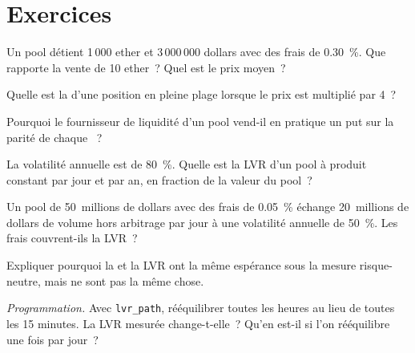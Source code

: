 \section{Exercices}

\begin{exercise}[$\star$]\label{exo:m3:automated-market-makers:1}
Un pool détient 1\,000 ether et 3\,000\,000 dollars avec des frais de 0.30~\%. Que rapporte la vente de 10 ether~? Quel est le prix moyen~?
\end{exercise}

\begin{exercise}[$\star$]\label{exo:m3:automated-market-makers:2}
Quelle est la  d'une position en pleine plage lorsque le prix est multiplié par 4~?
\end{exercise}

\begin{exercise}[$\star$]\label{exo:m3:automated-market-makers:3}
Pourquoi le fournisseur de liquidité d'un pool  vend-il en pratique un put sur la parité de chaque ~?
\end{exercise}

\begin{exercise}[$\star\star$]\label{exo:m3:automated-market-makers:4}
La volatilité annuelle est de 80~\%. Quelle est la LVR d'un pool à produit constant par jour et par an, en fraction de la valeur du pool~?
\end{exercise}

\begin{exercise}[$\star\star$]\label{exo:m3:automated-market-makers:5}
Un pool de 50~millions de dollars avec des frais de 0.05~\% échange 20~millions de dollars de volume hors arbitrage par jour à une volatilité annuelle de 50~\%. Les frais couvrent-ils la LVR~?
\end{exercise}

\begin{exercise}[$\star\star$]\label{exo:m3:automated-market-makers:6}
Expliquer pourquoi la  et la LVR ont la même espérance sous la mesure risque-neutre, mais ne sont pas la même chose.
\end{exercise}

\begin{exercise}[$\star\star\star$]\label{exo:m3:automated-market-makers:7}
\emph{Programmation.} Avec \texttt{lvr\_path}, rééquilibrer toutes les heures au lieu de toutes les 15 minutes. La LVR mesurée change-t-elle~? Qu'en est-il si l'on rééquilibre une fois par jour~?
\end{exercise}

